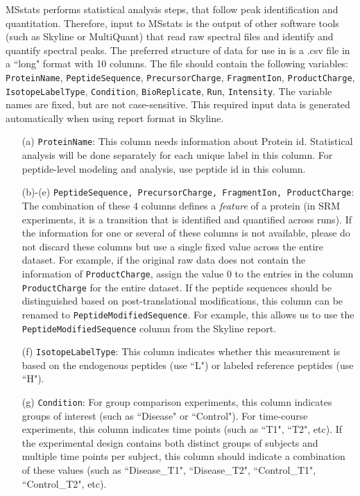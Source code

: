 \documentclass[11pt]{article}
\begin{document}
MSstats performs statistical analysis steps, that follow peak identification and quantitation. Therefore, input to MSstats is the output of other software tools (such as Skyline or MultiQuant) that read raw spectral files and identify and quantify spectral peaks. The preferred structure of data for use in \m is  a .csv file in a ``long" format with 10 columns. The file should contain the following variables: {\tt ProteinName}, {\tt PeptideSequence}, {\tt PrecursorCharge}, {\tt FragmentIon}, {\tt ProductCharge}, {\tt IsotopeLabelType}, {\tt Condition}, {\tt BioReplicate}, {\tt Run}, {\tt Intensity}.  The variable names are fixed, but are not case-sensitive. This required input data is generated automatically when using \m report format in Skyline.

\begin{enumerate}
\item[(a)] {\tt ProteinName}: This column needs information about Protein id. Statistical analysis will be done separately for each unique label in this column. For peptide-level modeling and analysis, use peptide id in this column.

\item[(b)-(e)] {\tt PeptideSequence, PrecursorCharge, FragmentIon, ProductCharge}: The combination of these 4 columns defines a {\it feature} of a protein (in SRM experiments, it is a transition that is identified and quantified across runs). If the information for one or several of these columns is not available, please do not discard these columns but use a single fixed value across the entire dataset. For example, if the original raw data does not contain the information of {\tt ProductCharge}, assign the value 0 to the entries in the column {\tt ProductCharge} for the entire dataset. If the peptide sequences should be distinguished based on post-translational modifications, this column can be renamed to {\tt PeptideModifiedSequence}. For example, this allows us to use the {\tt PeptideModifiedSequence} column from the Skyline report.


\item[(f)] {\tt IsotopeLabelType}: This column indicates whether this measurement is based on the endogenous peptides (use ``L") or labeled reference peptides (use ``H"). 

\item[(g)] {\tt Condition}: For group comparison experiments, this column indicates groups of interest (such as ``Disease" or ``Control"). For time-course experiments, this column indicates time points (such as ``T1", ``T2", etc). If the experimental design contains both distinct groups of subjects and multiple time points per subject, this column should indicate a combination of these values (such as ``Disease\_T1", ``Disease\_T2", ``Control\_T1", ``Control\_T2", etc).


\end{enumerate}
\end{document}
